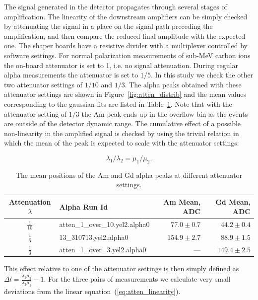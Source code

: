 \documentclass[a4paper,12pt]{article}
\begin{document}
The signal generated in the detector propagates through several stages of
amplification. The linearity of the downstream amplifiers can be simply checked
by attenuating the signal in a place on the signal path preceding the
amplification, and then compare the reduced final amplitude with the expected
one. The shaper boards have a resistive divider with a multiplexer controlled by
software settings. For normal polarization measurements of sub-MeV carbon ions
the on-board attenuator is set to 1, i.e. no signal attenuation. During regular
alpha measurements the attenuator is set to $1/5$. In this study we check the
other two attenuator settings of $1/10$ and $1/3$. The alpha peaks obtained with
these attenuator settings are shown in Figure~\ref{fig:atten_distrib} and the
mean values corresponding to the gaussian fits are listed in
Table~\ref{table:atten}. Note that with the attenuator setting of $1/3$ the Am
peak ends up in the overflow bin as the events are outside of the detector
dynamic range. The cumulative effect of a possible non-linearity in the
amplified signal is checked by using the trivial relation in which the mean of
the peak is expected to scale with the attenuator settings:

\begin{equation}
\lambda_1/\lambda_2 = \mu_1/ \mu_2.
\label{eq:atten_linearity}
\end{equation}


\begin{table}[htb]
\caption{The mean positions of the Am and Gd alpha peaks at different attenuator settings.}
\centering

\begin{tabular}{clrr}
\toprule
Attenuation $\lambda$ & Alpha Run Id      & Am Mean, ADC      & Gd Mean, ADC \\
\midrule
$\frac{1}{10}$  & \small{atten\_1\_over\_10.yel2.alpha0}  & $77.0\pm0.7$      & $44.2\pm0.4$ \\
\addlinespace
$\frac{1}{5}$   & \small{13\_310713.yel2.alpha0}          & $154.9\pm2.7$     & $88.9\pm1.5$ \\
\addlinespace
$\frac{1}{3}$   & \small{atten\_1\_over\_3.yel2.alpha0}   & ---\hspace{20pt}  & $149.4\pm2.5$ \\
\bottomrule
\end{tabular}

\label{table:atten}
\end{table}

\noindent
This effect relative to one of the attenuator settings is then simply defined as
$\Delta l = \frac{\lambda_1 \mu_2}{\lambda_2 \mu_1} - 1$. For the three pairs
of measurements we calculate very small deviations from the linear
equation~(\ref{eq:atten_linearity}).
\end{document}
